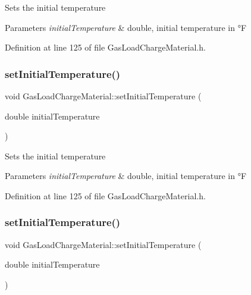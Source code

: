 Sets the initial temperature 
\begin{DoxyParams}{Parameters}
{\em initial\+Temperature} & double, initial temperature in °F \\
\hline
\end{DoxyParams}


Definition at line 125 of file Gas\+Load\+Charge\+Material.\+h.

\mbox{\label{class_gas_load_charge_material_aec9ddfce5e31099b6a047e3d98d80d47}} 
\subsubsection{\texorpdfstring{set\+Initial\+Temperature()}{setInitialTemperature()}\hspace{0.1cm}{\footnotesize\ttfamily [2/3]}}
{\footnotesize\ttfamily void Gas\+Load\+Charge\+Material\+::set\+Initial\+Temperature (\begin{DoxyParamCaption}\item[{double}]{initial\+Temperature }\end{DoxyParamCaption})\hspace{0.3cm}{\ttfamily [inline]}}

Sets the initial temperature 
\begin{DoxyParams}{Parameters}
{\em initial\+Temperature} & double, initial temperature in °F \\
\hline
\end{DoxyParams}


Definition at line 125 of file Gas\+Load\+Charge\+Material.\+h.

\mbox{\label{class_gas_load_charge_material_aec9ddfce5e31099b6a047e3d98d80d47}} 
\subsubsection{\texorpdfstring{set\+Initial\+Temperature()}{setInitialTemperature()}\hspace{0.1cm}{\footnotesize\ttfamily [3/3]}}
{\footnotesize\ttfamily void Gas\+Load\+Charge\+Material\+::set\+Initial\+Temperature (\begin{DoxyParamCaption}\item[{double}]{initial\+Temperature }\end{DoxyParamCaption})\hspace{0.3cm}{\ttfamily [inline]}}

